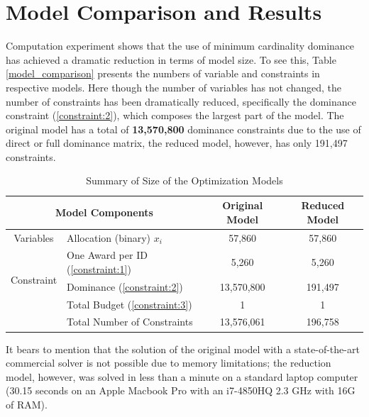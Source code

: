 \documentclass[12pt,english]{report}
\begin{document}
\section{Model Comparison and Results}
Computation experiment shows that the use of minimum cardinality dominance has
achieved a dramatic reduction in terms of model size.  To see this, Table
\ref{model_comparison} presents the numbers of variable and constraints in
respective models. Here though the number of variables has not changed, the
number of constraints has been dramatically reduced, specifically the dominance
constraint (\ref{constraint:2}), which composes the largest part of the model.
The original model has a total of \textbf{13,570,800} dominance constraints due
to the use of direct or full dominance matrix, the reduced model, however, has
only 191,497 constraints.

\begin{table}[]
\centering
\begin{tabular}{|c|l|c|c|}
\hline
\multicolumn{2}{|c|}{Model Components}                                        &
Original Model & Reduced Model \\ \hline
Variables                   & \multicolumn{1}{|l|}{Allocation (binary)  $x_i$}
& 57,860         & 57,860        \\ \hline
\multirow{3}{*}{Constraint} & One Award per ID  (\ref{constraint:1})        &
5,260          & 5,260         \\ \cline{2-4}
& Dominance  (\ref{constraint:2})               & 13,570,800     & 191,497
\\ \cline{2-4}
& Total Budget   (\ref{constraint:3})           & 1              & 1
\\ \cline{2-4}
& Total Number of Constraints                   & 13,576,061     & 196,758
\\ \hline
\end{tabular}
\caption{Summary of Size of the Optimization Models }
\label{model_comparison}
\label{size_model}
\end{table}

It bears to mention that the solution of the original model with a
state-of-the-art commercial solver is not possible due to memory limitations;
the reduction model, however,  was solved in less than a minute on a standard
laptop computer (30.15 seconds on an Apple Macbook Pro with an i7-4850HQ 2.3
GHz with 16G of RAM).
\end{document}
